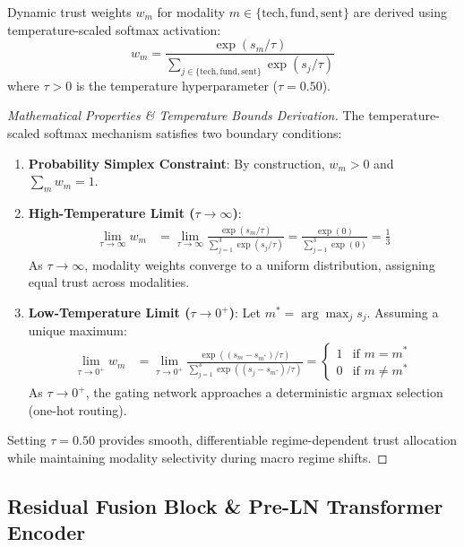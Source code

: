 Dynamic trust weights $w_m$ for modality $m \in \{\text{tech}, \text{fund}, \text{sent}\}$ are derived using temperature-scaled softmax activation:
\begin{equation}
w_m = \frac{\exp(s_m / \tau)}{\sum_{j \in \{\text{tech}, \text{fund}, \text{sent}\}} \exp(s_j / \tau)}
\label{eq:ch3_temperature_softmax}
\end{equation}
where $\tau > 0$ is the temperature hyperparameter ($\tau = 0.50$).

\begin{proof}[Mathematical Properties \& Temperature Bounds Derivation]
The temperature-scaled softmax mechanism satisfies two boundary conditions:
\begin{enumerate}
    \item \textbf{Probability Simplex Constraint}: By construction, $w_m > 0$ and $\sum_{m} w_m = 1$.
    \item \textbf{High-Temperature Limit ($\tau \to \infty$)}:
    \begin{align}
    \lim_{\tau \to \infty} w_m &= \lim_{\tau \to \infty} \frac{\exp(s_m / \tau)}{\sum_{j=1}^3 \exp(s_j / \tau)} = \frac{\exp(0)}{\sum_{j=1}^3 \exp(0)} = \frac{1}{3}
    \end{align}
    As $\tau \to \infty$, modality weights converge to a uniform distribution, assigning equal trust across modalities.
    \item \textbf{Low-Temperature Limit ($\tau \to 0^+$)}: Let $m^* = \arg\max_{j} s_j$. Assuming a unique maximum:
    \begin{align}
    \lim_{\tau \to 0^+} w_m &= \lim_{\tau \to 0^+} \frac{\exp((s_m - s_{m^*}) / \tau)}{\sum_{j=1}^3 \exp((s_j - s_{m^*}) / \tau)} = \begin{cases} 
    1 & \text{if } m = m^* \\
    0 & \text{if } m \neq m^*
    \end{cases}
    \end{align}
    As $\tau \to 0^+$, the gating network approaches a deterministic argmax selection (one-hot routing).
\end{enumerate}
Setting $\tau = 0.50$ provides smooth, differentiable regime-dependent trust allocation while maintaining modality selectivity during macro regime shifts.
\end{proof}

\subsection{Residual Fusion Block \& Pre-LN Transformer Encoder}
\label{subsec:ch3_fusion_transformer}

